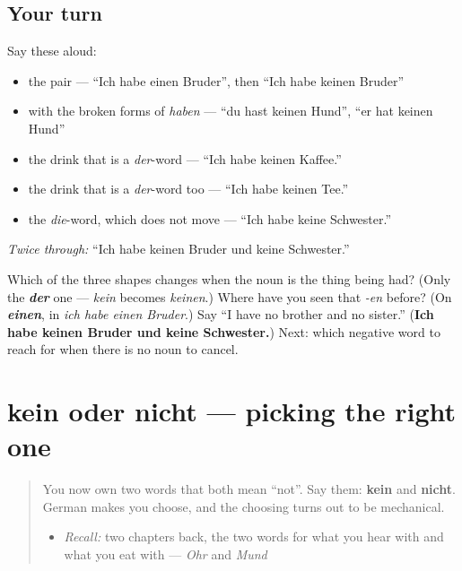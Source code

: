 \subsection*{Your turn}
Say these aloud:

\begin{itemize}
\raggedright
  \item the pair — \textquotedblleft{}Ich habe einen Bruder\textquotedblright{}, then \textquotedblleft{}Ich habe keinen Bruder\textquotedblright{}
  \item with the broken forms of \emph{haben} — \textquotedblleft{}du hast keinen Hund\textquotedblright{}, \textquotedblleft{}er hat keinen Hund\textquotedblright{}
  \item the drink that is a \emph{der}-word — \textquotedblleft{}Ich habe keinen Kaffee.\textquotedblright{}
  \item the drink that is a \emph{der}-word too — \textquotedblleft{}Ich habe keinen Tee.\textquotedblright{}
  \item the \emph{die}-word, which does not move — \textquotedblleft{}Ich habe keine Schwester.\textquotedblright{}
\end{itemize}

\emph{Twice through:} \textquotedblleft{}Ich habe keinen Bruder und keine Schwester.\textquotedblright{}

\begin{tcolorbox}[breakable,colback=teal!4,colframe=teal!35!black,title={Before you move on}]
Which of the three shapes changes when the noun is the thing being had? (Only the \emph{\textbf{der}} one — \emph{kein} becomes \emph{keinen}.) Where have you seen that \emph{-en} before? (On \emph{\textbf{einen}}, in \emph{ich habe einen Bruder}.) Say \textquotedblleft{}I have no brother and no sister.\textquotedblright{} (\textbf{Ich habe keinen Bruder und keine Schwester.}) Next: which negative word to reach for when there is no noun to cancel.
\end{tcolorbox}
\section[kein oder nicht]{kein oder nicht — picking the right one}

\label{lesson:GE-C32-kein-oder-nicht}



\begin{quote}
You now own two words that both mean \textquotedblleft{}not\textquotedblright{}. Say them: \textbf{kein} and \textbf{nicht}. German makes you choose, and the choosing turns out to be mechanical.

\begin{itemize}
\raggedright
  \item \emph{Recall:} two chapters back, the two words for what you hear with and what you eat with — \emph{Ohr} and \emph{Mund}
\end{itemize}
\end{quote}

